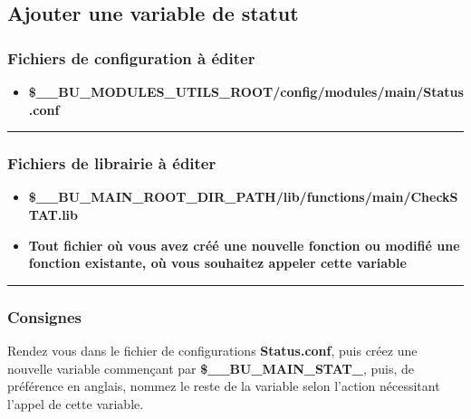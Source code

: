 \documentclass[a4paper,10pt]{article}
\begin{document}
\color{green}
\subsection{Ajouter une variable de statut}\color{white}

\color{blue}
\subsubsection{Fichiers de configuration à éditer}\color{white}

\begin{itemize}
    \item \textbf{\color{orange}\$\_\_BU\_MODULES\_UTILS\_ROOT\color{lime}/config/modules/main/Status.conf}\\[1\baselineskip]
\end{itemize}



\color{blue}\par\noindent\rule{\textwidth}{0.4pt}\color{white}

\color{blue}
\subsubsection{Fichiers de librairie à éditer}\color{white}

\begin{itemize}
    \item \textbf{\color{orange}\$\_\_BU\_MAIN\_ROOT\_DIR\_PATH\color{lime}/lib/functions/main/CheckSTAT.lib}\\[1\baselineskip]

    \item \textbf{Tout fichier où vous avez créé une nouvelle fonction ou modifié une fonction existante, où vous souhaitez appeler cette variable}\\[1\baselineskip]
\end{itemize}



\color{blue}\par\noindent\rule{\textwidth}{0.4pt}\color{white}

\color{blue}
\subsubsection{Consignes}\color{white}

Rendez vous dans le fichier de configurations \textbf{\color{lime}Status.conf}, puis créez une nouvelle variable commençant par \textbf{\color{orange}\$\_\_BU\_MAIN\_STAT\_}, puis, de préférence en anglais, nommez le reste de la variable selon l'action nécessitant l'appel de cette variable.\\[1\baselineskip]
\end{document}
